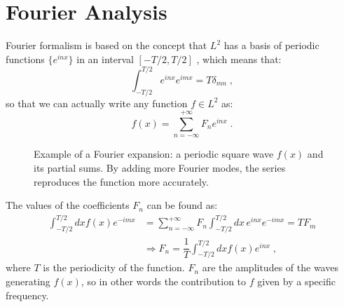 \documentclass[12pt,a4paper]{article}
\begin{document}
\section{Fourier Analysis}
Fourier formalism is based on the concept that $L^2$ has a basis of periodic functions $\{e^{inx}\}$ in an interval $[-T/2, T/2]$ , which means that:
$$
\int_{-T/2}^{T/2} e^{inx} e^{imx} = T \delta_{mn} \;,
$$
so that we can actually write any function $f \in L^2$ as:
$$
f(x) = \sum_{n=-\infty}^{+\infty} F_n e^{inx}\;.
$$
\begin{figure}[h]
	\centering
	\caption{Example of a Fourier expansion: a periodic square wave $f(x)$ and its partial sums. By adding more Fourier modes, the series reproduces the function more accurately.}
\end{figure}

The values of the coefficients $F_n$ can be found as:
\begin{align*}
	\int_{-T/2}^{T/2} dx f(x) e^{-imx} &= \sum_{n=-\infty}^{+\infty} F_n \int_{-T/2}^{T/2} dx \, e^{inx} e^{-imx} = TF_m \\[5pt]
	&\Rightarrow F_n = \dfrac{1}{T} \int_{-T/2}^{T/2} dx f(x) e^{inx}\;,
\end{align*}
where $T$ is the periodicity of the function. $F_n$ are the amplitudes of the waves generating $f(x)$, so in other words the contribution to $f$ given by a specific frequency.
\end{document}
